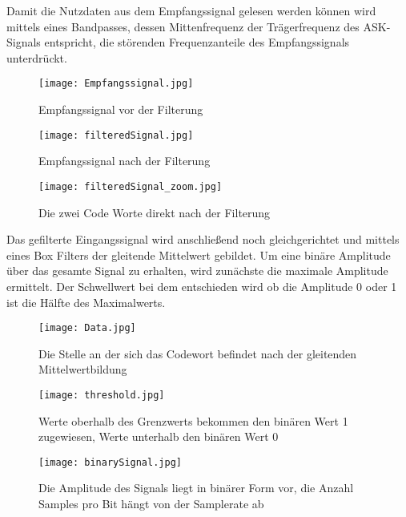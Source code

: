 \documentclass[10pt]{scrartcl}
\begin{document}
Damit die Nutzdaten aus dem Empfangssignal gelesen werden können wird mittels eines Bandpasses, dessen Mittenfrequenz der Trägerfrequenz des ASK-Signals entspricht, die störenden Frequenzanteile des Empfangssignals unterdrückt.
 
\begin{figure}[h!]
	\centering
	\texttt{[image: Empfangssignal.jpg]}
	\caption{Empfangssignal vor der Filterung}
	\label{img:1bit}
\end{figure} 

\begin{figure}[h!]
	\centering
	\texttt{[image: filteredSignal.jpg]}
	\caption{Empfangssignal nach der Filterung}
	\label{img:1bit}
\end{figure}  
\begin{figure}[h!]
	\centering
	\texttt{[image: filteredSignal\_zoom.jpg]}
	\caption{Die zwei Code Worte direkt nach der Filterung}
	\label{img:1bit}
\end{figure}  
\clearpage
Das gefilterte Eingangssignal wird anschließend noch gleichgerichtet und mittels eines Box Filters der gleitende Mittelwert gebildet. Um eine binäre Amplitude über das gesamte Signal zu erhalten, wird zunächste die maximale Amplitude ermittelt. Der Schwellwert bei dem entschieden wird ob die Amplitude 0 oder 1 ist die Hälfte des Maximalwerts.

\begin{figure}[h!]
	\centering
	\texttt{[image: Data.jpg]}
	\caption{Die Stelle an der sich das Codewort befindet nach der gleitenden Mittelwertbildung}
	\label{img:1bit}
\end{figure}
\begin{figure}[h!]
	\centering
	\texttt{[image: threshold.jpg]}
	\caption{Werte oberhalb des Grenzwerts bekommen den binären Wert 1 zugewiesen, Werte unterhalb den binären Wert 0}
	\label{img:1bit}
\end{figure}
\begin{figure}[h!]
	\centering
	\texttt{[image: binarySignal.jpg]}
	\caption{Die Amplitude des Signals liegt in binärer Form vor, die Anzahl Samples pro Bit hängt von der Samplerate ab}
	\label{img:1bit}
\end{figure}
\clearpage
\newpage
\end{document}
